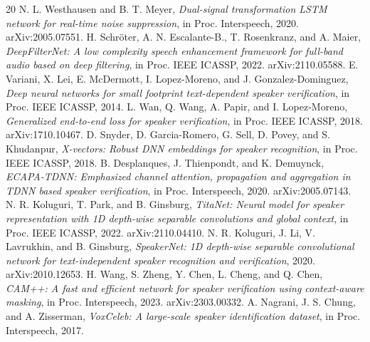 \documentclass{llncs}
\begin{document}

\begin{thebibliography}{20}
 N. L. Westhausen and B. T. Meyer, \emph{Dual-signal transformation LSTM network for real-time noise suppression}, in Proc. Interspeech, 2020. arXiv:2005.07551.
 H. Schr\"oter, A. N. Escalante-B., T. Rosenkranz, and A. Maier, \emph{DeepFilterNet: A low complexity speech enhancement framework for full-band audio based on deep filtering}, in Proc. IEEE ICASSP, 2022. arXiv:2110.05588.
 E. Variani, X. Lei, E. McDermott, I. Lopez-Moreno, and J. Gonzalez-Dominguez, \emph{Deep neural networks for small footprint text-dependent speaker verification}, in Proc. IEEE ICASSP, 2014.
 L. Wan, Q. Wang, A. Papir, and I. Lopez-Moreno, \emph{Generalized end-to-end loss for speaker verification}, in Proc. IEEE ICASSP, 2018. arXiv:1710.10467.
 D. Snyder, D. Garcia-Romero, G. Sell, D. Povey, and S. Khudanpur, \emph{X-vectors: Robust DNN embeddings for speaker recognition}, in Proc. IEEE ICASSP, 2018.
 B. Desplanques, J. Thienpondt, and K. Demuynck, \emph{ECAPA-TDNN: Emphasized channel attention, propagation and aggregation in TDNN based speaker verification}, in Proc. Interspeech, 2020. arXiv:2005.07143.
 N. R. Koluguri, T. Park, and B. Ginsburg, \emph{TitaNet: Neural model for speaker representation with 1D depth-wise separable convolutions and global context}, in Proc. IEEE ICASSP, 2022. arXiv:2110.04410.
 N. R. Koluguri, J. Li, V. Lavrukhin, and B. Ginsburg, \emph{SpeakerNet: 1D depth-wise separable convolutional network for text-independent speaker recognition and verification}, 2020. arXiv:2010.12653.
 H. Wang, S. Zheng, Y. Chen, L. Cheng, and Q. Chen, \emph{CAM++: A fast and efficient network for speaker verification using context-aware masking}, in Proc. Interspeech, 2023. arXiv:2303.00332.
 A. Nagrani, J. S. Chung, and A. Zisserman, \emph{VoxCeleb: A large-scale speaker identification dataset}, in Proc. Interspeech, 2017.

\end{thebibliography}
\end{document}
